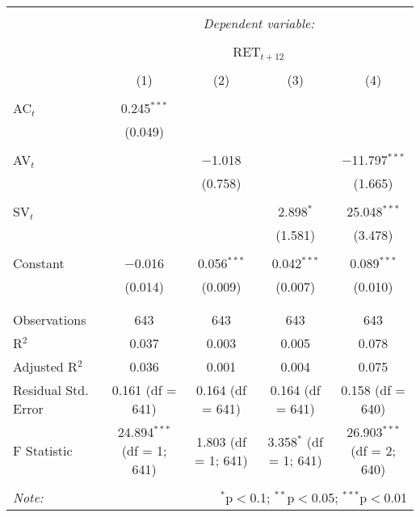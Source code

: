 
\begin{table}[!htbp] \centering 
  \caption{} 
  \label{} 
\begin{tabular}{@{\extracolsep{5pt}}lcccc} 
\\[-1.8ex]\hline 
\hline \\[-1.8ex] 
 & \multicolumn{4}{c}{\textit{Dependent variable:}} \\ 
\cline{2-5} 
\\[-1.8ex] & \multicolumn{4}{c}{RET$_{t+12}$} \\ 
\\[-1.8ex] & (1) & (2) & (3) & (4)\\ 
\hline \\[-1.8ex] 
 AC$_{t}$ & 0.245$^{***}$ &  &  &  \\ 
  & (0.049) &  &  &  \\ 
  & & & & \\ 
 AV$_{t}$ &  & $-$1.018 &  & $-$11.797$^{***}$ \\ 
  &  & (0.758) &  & (1.665) \\ 
  & & & & \\ 
 SV$_{t}$ &  &  & 2.898$^{*}$ & 25.048$^{***}$ \\ 
  &  &  & (1.581) & (3.478) \\ 
  & & & & \\ 
 Constant & $-$0.016 & 0.056$^{***}$ & 0.042$^{***}$ & 0.089$^{***}$ \\ 
  & (0.014) & (0.009) & (0.007) & (0.010) \\ 
  & & & & \\ 
\hline \\[-1.8ex] 
Observations & 643 & 643 & 643 & 643 \\ 
R$^{2}$ & 0.037 & 0.003 & 0.005 & 0.078 \\ 
Adjusted R$^{2}$ & 0.036 & 0.001 & 0.004 & 0.075 \\ 
Residual Std. Error & 0.161 (df = 641) & 0.164 (df = 641) & 0.164 (df = 641) & 0.158 (df = 640) \\ 
F Statistic & 24.894$^{***}$ (df = 1; 641) & 1.803 (df = 1; 641) & 3.358$^{*}$ (df = 1; 641) & 26.903$^{***}$ (df = 2; 640) \\ 
\hline 
\hline \\[-1.8ex] 
\textit{Note:}  & \multicolumn{4}{r}{$^{*}$p$<$0.1; $^{**}$p$<$0.05; $^{***}$p$<$0.01} \\ 
\end{tabular} 
\end{table} 
